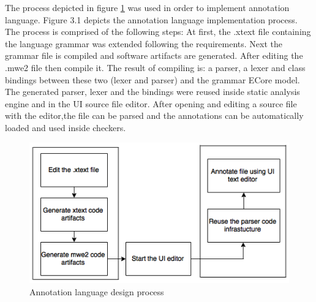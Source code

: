 The process depicted in figure \ref{figure:Language_Design_Process} was used in order to
implement annotation language. Figure 3.1 depicts the
annotation language implementation process. The process is
comprised of the following steps: At first, the .xtext file
containing the language grammar was extended following the requirements. Next the grammar file is compiled and software
artifacts are generated. After editing the .mwe2 file then compile it. The result of compiling is: a parser, a lexer and class bindings between these two (lexer and parser) and the grammar ECore model. The generated parser, lexer and the bindings were reused inside static analysis engine and in the UI source file editor. After opening and editing a source file with the editor,the file can be parsed and the annotations can be automatically loaded and used inside checkers.
\begin{figure}[htbp]
	\centering
	\includegraphics{styles/Language_Design_Process.png}
	\caption{Annotation language design process}
	\label{figure:Language_Design_Process}
\end{figure}